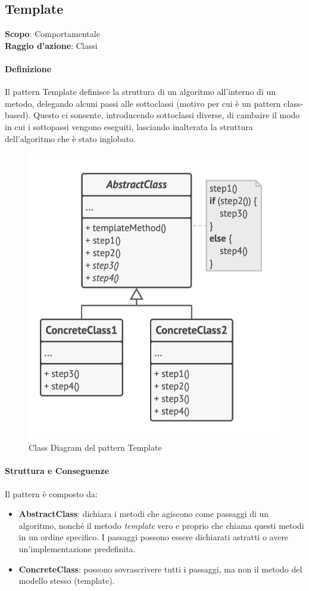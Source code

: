 \subsection{Template}
\label{template}

\textbf{Scopo}: Comportamentale \\
\textbf{Raggio d'azione}: Classi

\paragraph{Definizione} Il pattern Template definisce la struttura di un algoritmo all'interno di un metodo, delegando alcuni passi alle sottoclassi (motivo per cui è un pattern class-based). Questo ci sonsente, introducendo sottoclassi diverse, di cambaire il modo in cui i sottopassi vengono eseguiti, lasciando inalterata la struttura dell'algoritmo che è stato inglobato.

\begin{figure}[H]
    \centering
    \includegraphics[width=0.5\linewidth]{assets/pattern/template/template-struttura.png}
    \caption{Class Diagram del pattern Template}
\end{figure}

\paragraph{Struttura e Conseguenze} Il pattern è composto da:
\begin{itemize}
    \item \textbf{AbstractClass}: dichiara i metodi che agiscono come passaggi di un algoritmo, nonché il metodo \textit{template} vero e proprio che chiama questi metodi in un ordine specifico. I passaggi possono essere dichiarati astratti o avere un'implementazione predefinita.
    \item \textbf{ConcreteClass}: possono sovrascrivere tutti i passaggi, ma non il metodo del modello stesso (template).
\end{itemize}

